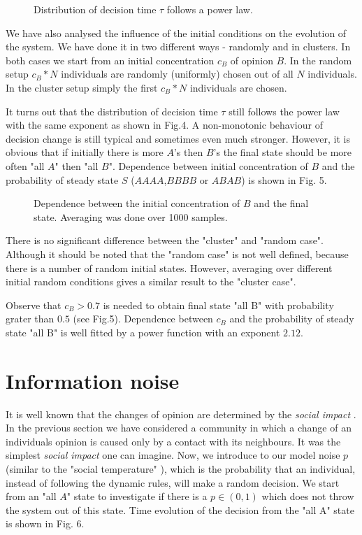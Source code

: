 \begin{figure}[htbp]
\centerline{\epsfxsize=12cm }
\caption{Distribution of decision time $\tau$ follows a power law.
}
\end{figure}

We have also analysed the influence of the initial conditions on the
evolution of the system.
We have done it in two different ways - randomly and in clusters.
In both cases we start from an initial concentration $c_B$ of opinion $B$.
In the random setup $c_B*N$ individuals are randomly (uniformly) chosen
out of all $N$ individuals. In the cluster setup simply the first $c_B*N$
individuals are chosen. 

It turns out that the distribution of decision time $\tau$ still follows 
the power law with the same exponent as shown in Fig.4. A non-monotonic 
behaviour of decision change is still typical and sometimes even much stronger. 
However, it is obvious that if initially there is more $A$'s then $B$'s 
the final state should be more often "all $A$" then "all $B$". Dependence
between initial concentration of $B$ and the probability of steady
state $S$ ($AAAA$,$BBBB$ or $ABAB$) is shown in Fig. 5. 

\begin{figure}[htbp]
\centerline{\epsfxsize=12cm }
\caption{Dependence between the initial concentration of $B$ and the final
state. Averaging was done over 1000 samples.
}
\end{figure}

There is no significant difference between the "cluster" and "random case".
Although it should be noted that the "random case"
is not well defined, because there is a number of random
initial states. However, averaging over different initial random conditions
gives a similar result to the "cluster case".

Observe that $c_B>0.7$ is needed to obtain final state "all B" with
probability grater than $0.5$ (see Fig.5). Dependence between $c_B$ and the
probability of steady state "all B" is well fitted by a power function with
an exponent $2.12$.

\section{Information noise}

It is well known that the changes of opinion are determined by the 
{\it social impact} \cite{Latane}.
In the previous section we have considered a community in which
a change of an individuals opinion is caused only by a contact
with its neighbours. It was the simplest {\it social impact} one can imagine. 
Now, we introduce to our model noise $p$ (similar to the
"social temperature" \cite{Holyst}), which
is the probability that an individual, instead of following the
dynamic rules, will make a random decision. We start from an "all $A$" 
state to investigate if there is a $p \in (0,1)$ which does not throw the
system out of this state. Time evolution of the decision from the "all
A" state is shown in Fig. 6.


